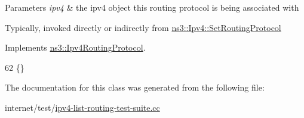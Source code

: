 \begin{DoxyParams}{Parameters}
{\em ipv4} & the ipv4 object this routing protocol is being associated with\\
\hline
\end{DoxyParams}
Typically, invoked directly or indirectly from \hyperlink{classns3_1_1Ipv4_a2d165c3bafd4ca580f02a03536db80d3}{ns3\+::\+Ipv4\+::\+Set\+Routing\+Protocol} 

Implements \hyperlink{classns3_1_1Ipv4RoutingProtocol_af3947a05b912ea3f2a1ef0e9777f723e}{ns3\+::\+Ipv4\+Routing\+Protocol}.


\begin{DoxyCode}
62 \{\}
\end{DoxyCode}


The documentation for this class was generated from the following file\+:\begin{DoxyCompactItemize}
\item 
internet/test/\hyperlink{ipv4-list-routing-test-suite_8cc}{ipv4-\/list-\/routing-\/test-\/suite.\+cc}\end{DoxyCompactItemize}
